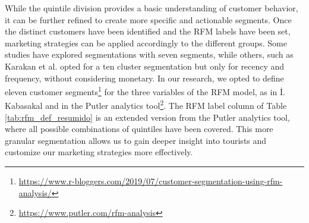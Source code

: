 \documentclass{ws-ijitdm}
\begin{document}
While the quintile division provides a basic understanding of customer behavior, it can be further refined to create more specific and actionable segments. Once the distinct customers have been identified and the RFM labels have been set, marketing strategies can be applied accordingly to the different groups. Some studies have explored segmentations with seven segments\cite{40}, while others, such as Karakan et al.\cite{21} opted for a ten cluster segmentation but only for recency and frequency, without considering monetary. In our research, we opted to define eleven customer segments\footnote{\url{https://www.r-bloggers.com/2019/07/customer-segmentation-using-rfm-analysis/}} for the three variables of the RFM model, as in İ. Kabasakal\cite{41} and in the Putler analytics tool\footnote{\url{https://www.putler.com/rfm-analysis}}. The RFM label column of Table \ref{tab:rfm_def_resumido} is an extended version from the Putler analytics tool, where all possible combinations of quintiles have been covered. This more granular segmentation allows us to gain deeper insight into tourists and customize our marketing strategies more effectively.
\end{document}
